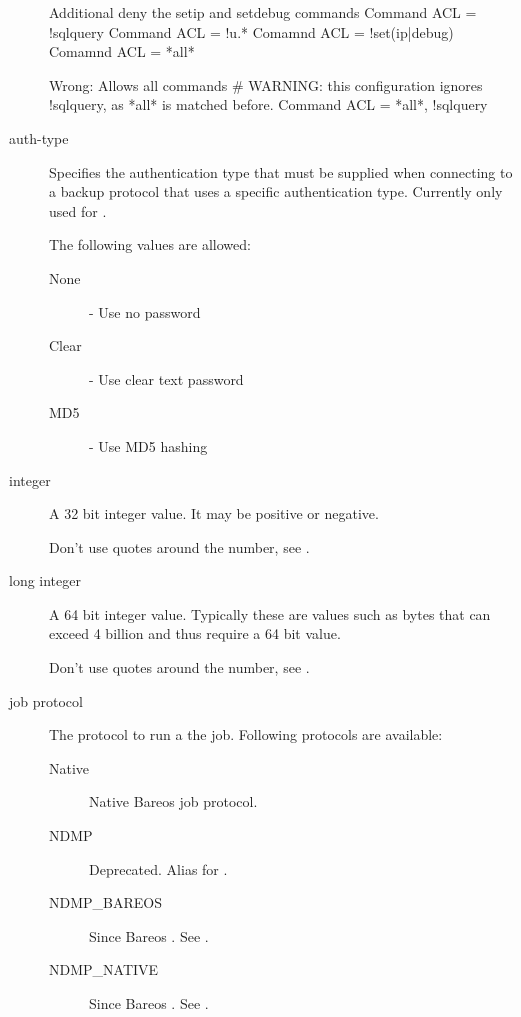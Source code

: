 \begin{description}
\begin{bconfig}{Additional deny the setip and setdebug commands}
Command ACL = !sqlquery
Command ACL = !u.*
Comamnd ACL = !set(ip|debug)
Comamnd ACL = *all*
\end{bconfig}

\begin{bconfig}{Wrong: Allows all commands}
# WARNING: this configuration ignores !sqlquery, as *all* is matched before.
Command ACL = *all*, !sqlquery
\end{bconfig}

\item [auth-type]
    \label{DataTypeAuthType}
Specifies the authentication type that must be supplied when connecting to
a backup protocol that uses a specific authentication type.
Currently only used for .

The following values are allowed:
\begin{description}
\item[None] - Use no password
\item[Clear] - Use clear text password
\item[MD5] - Use MD5 hashing
\end{description}


\item [integer]
    \label{DataTypeInteger}
   A 32 bit integer value. It may be positive or negative.

   Don't use quotes around the number, see .


\item [long integer]
    \label{DataTypeLongInteger}
   A 64 bit integer value. Typically these  are values such as bytes that can
exceed 4 billion and thus  require a 64 bit value.

   Don't use quotes around the number, see .

\item [job protocol]
    \label{DataTypeJobProtocol}

The protocol to run a the job.
Following protocols are available:
\begin{description}
    \item[Native] Native Bareos job protocol.
    \item[NDMP] Deprecated. Alias for \NdmpBareos.
    \item[NDMP\_BAREOS] Since Bareos . See .
    \item[NDMP\_NATIVE] Since Bareos . See .
\end{description}




\end{description}
